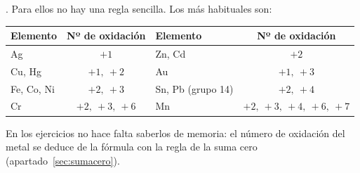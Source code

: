 \documentclass[12pt]{article}
\theoremstyle{mygreennumbox}
\begin{document}
. Para ellos no hay una regla sencilla. Los más habituales son:

\begin{center}
    \begin{tabular}{@{}lclc@{}}
        \toprule
        \textbf{Elemento} & \textbf{Nº de oxidación} & \textbf{Elemento} & \textbf{Nº de oxidación} \\
        \midrule
        Ag & \(+1\) & Zn, Cd & \(+2\) \\[3pt]
        Cu, Hg & \(+1,\ +2\) & Au & \(+1,\ +3\) \\[3pt]
        Fe, Co, Ni & \(+2,\ +3\) & Sn, Pb (grupo 14) & \(+2,\ +4\) \\[3pt]
        Cr & \(+2,\ +3,\ +6\) & Mn & \(+2,\ +3,\ +4,\ +6,\ +7\) \\
        \bottomrule
    \end{tabular}
\end{center}

En los ejercicios no hace falta saberlos de memoria: el número de oxidación del metal se deduce de la fórmula con la regla de la suma cero (apartado~\ref{sec:sumacero}).
\end{document}
